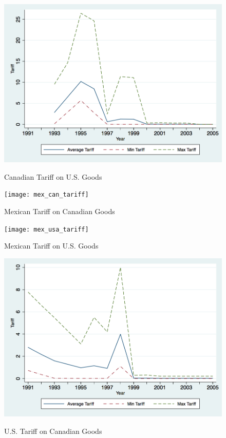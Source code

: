 \documentclass[a4paper,12pt]{article}
\begin{document}
\begin{figure}[htpb]\centering
\caption{Canadian Tariff on U.S. Goods}\vspace{0.2cm}
\includegraphics[scale=0.35]{can_usa_tariff}
\label{fig:can_usa}
\end{figure}

\newpage

\begin{figure}[htpb]\centering
\caption{\small Mexican Tariff on Canadian Goods}\vspace{0.2cm}
\texttt{[image: mex\_can\_tariff]}
\label{fig:mex_can}
\end{figure}

\begin{figure}[htpb]\centering
\caption{\small Mexican Tariff on U.S. Goods}\vspace{0.2cm}
\texttt{[image: mex\_usa\_tariff]}
\label{fig:mex_usa}
\end{figure}

\newpage

\begin{figure}[htpb]\centering
\caption{\small U.S. Tariff on Canadian Goods}\vspace{0.2cm}
\includegraphics[scale=0.35]{usa_can_tariff}
\label{fig:usa_can}
\end{figure}
 
\end{document}

